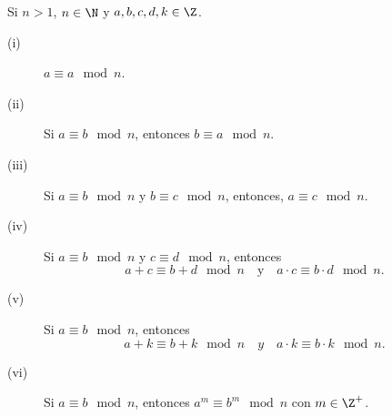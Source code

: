 \begin{fprop}
\normalfont Si $\displaystyle n > 1 $, $\displaystyle n \in \N $ y $\displaystyle a,b,c,d,k \in \Z $. 
\begin{description}
\item[(i)] $\displaystyle a \equiv a \mod n $.
\item[(ii)] Si $\displaystyle a \equiv b \mod n $, entonces $\displaystyle b \equiv a \mod n $.
\item[(iii)] Si $\displaystyle a\equiv b \mod n $ y $\displaystyle b \equiv c \mod n $, entonces, $\displaystyle a \equiv c \mod n $.
\item[(iv)] Si $\displaystyle a \equiv b \mod n $ y $\displaystyle c \equiv d\mod n $, entonces
	\[a + c \equiv b + d \mod n \quad \text{y} \quad a \cdot c \equiv b \cdot d \mod n .\]
\item[(v)] Si $\displaystyle a \equiv b \mod n $, entonces
	\[a + k \equiv b + k \mod n \quad y \quad a \cdot k \equiv b \cdot k \mod n .\]
\item[(vi)] Si $\displaystyle a \equiv b \mod n $, entonces $\displaystyle a^{m} \equiv b^{m} \mod n $ con $\displaystyle m \in \Z^{+} $.
\end{description}
\end{fprop}

